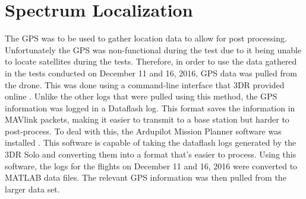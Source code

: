 \section{Spectrum Localization}
The GPS was to be used to gather location data to allow for post processing. Unfortunately the GPS was non-functional during the test due to it being unable to locate satellites during the tests. Therefore, in order to use the data gathered in the tests conducted on December 11 and 16, 2016, GPS 
data was pulled from the drone. This was done using a command-line interface that 
3DR provided online \cite{3dr_devguide}. Unlike the other logs that were pulled using this method,
the GPS information was logged in a Dataflash log. This format saves the information
in MAVlink packets, making it easier to transmit to a base station but harder
to post-process. To deal with this, the Ardupilot Mission Planner software was 
installed \cite{ard_mplanner}. This software is capable of taking the dataflash logs
generated by the 3DR Solo and converting them into a format that's easier to
process. Using this software, the logs for the flights on December 11 and 16, 2016 were 
converted to MATLAB data files. The relevant GPS information was then pulled from
the larger data set. \par

